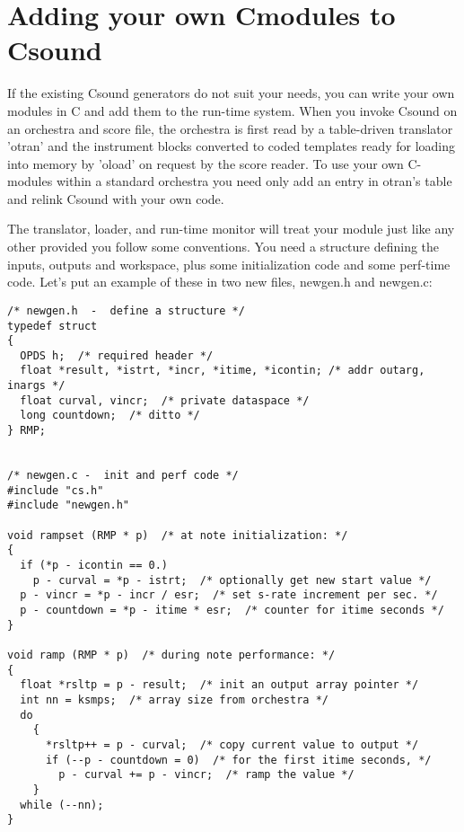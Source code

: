 \begin{comment}
\documentclass[10pt]{article}
\usepackage{fullpage, graphicx, url}
\setlength{\parskip}{1ex}
\setlength{\parindent}{0ex}
\title{Adding your own Cmodules to Csound}



\begin{tabular}{ccc}
The Alternative Csound Reference Manual & & \\
Previous & &Next

\end{tabular}

\end{comment}
\section{Adding your own Cmodules to Csound}


  If the existing Csound generators do not suit your needs, you can write your own modules in C and add them to the run-time system. When you invoke Csound on an orchestra and score file, the orchestra is first read by a table-driven translator 'otran' and the instrument blocks converted to coded templates ready for loading into memory by 'oload' on request by the score reader. To use your own C-modules within a standard orchestra you need only add an entry in otran's table and relink Csound with your own code. 


  The translator, loader, and run-time monitor will treat your module just like any other provided you follow some conventions. You need a structure defining the inputs, outputs and workspace, plus some initialization code and some perf-time code. Let's put an example of these in two new files, newgen.h and newgen.c: 


 
\begin{lstlisting}
/* newgen.h  -  define a structure */
typedef struct
{
  OPDS h;  /* required header */
  float *result, *istrt, *incr, *itime, *icontin; /* addr outarg, inargs */
  float curval, vincr;  /* private dataspace */
  long countdown;  /* ditto */
} RMP;


/* newgen.c -  init and perf code */
#include "cs.h"
#include "newgen.h"

void rampset (RMP * p)  /* at note initialization: */
{
  if (*p - icontin == 0.)
    p - curval = *p - istrt;  /* optionally get new start value */
  p - vincr = *p - incr / esr;  /* set s-rate increment per sec. */
  p - countdown = *p - itime * esr;  /* counter for itime seconds */
}
 
void ramp (RMP * p)  /* during note performance: */
{
  float *rsltp = p - result;  /* init an output array pointer */
  int nn = ksmps;  /* array size from orchestra */
  do
    {
      *rsltp++ = p - curval;  /* copy current value to output */
      if (--p - countdown = 0)  /* for the first itime seconds, */
        p - curval += p - vincr;  /* ramp the value */
    }
  while (--nn);
}                         
      
\end{lstlisting}


